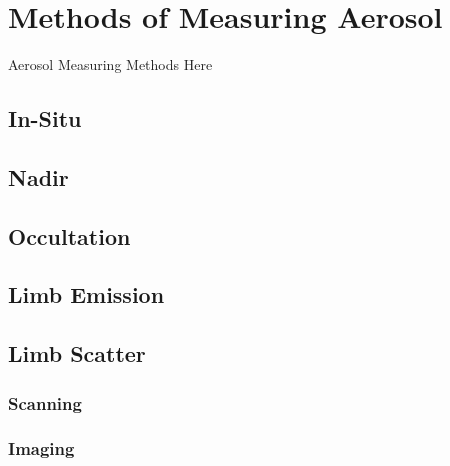 \section{Methods of Measuring Aerosol}

Aerosol Measuring Methods Here 

\subsection{In-Situ}
\subsection{Nadir}
\subsection{Occultation}
\subsection{Limb Emission}
\subsection{Limb Scatter}
\subsubsection{Scanning} 
\subsubsection{Imaging}